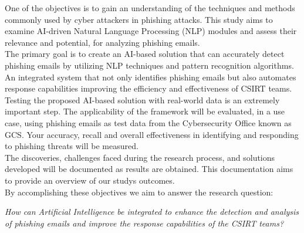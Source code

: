 One of the objectives is to gain an understanding of the techniques and methods commonly used by cyber attackers in phishing attacks.
This study aims to examine AI-driven Natural Language Processing (NLP) modules and assess their relevance and potential, for analyzing phishing emails.\\
The primary goal is to create an AI-based solution that can accurately detect phishing emails by utilizing NLP techniques and pattern recognition algorithms. An integrated system that not only identifies phishing emails but also automates response capabilities improving the efficiency and effectiveness of CSIRT teams.\\
Testing the proposed AI-based solution with real-world data is an extremely important step. The applicability of the framework will be evaluated, in a use case, using phishing emails as test data from the Cybersecurity Office known as GCS. Your accuracy, recall and overall effectiveness in identifying and responding to phishing threats will be measured.\\
The discoveries, challenges faced during the research process, and solutions developed will be documented as results are obtained. This documentation aims to provide an overview of our studys outcomes. \\
By accomplishing these objectives we aim to answer the research question:

\textit{How can Artificial Intelligence be integrated to enhance the detection and analysis of phishing emails and improve the response capabilities of the CSIRT teams?}


